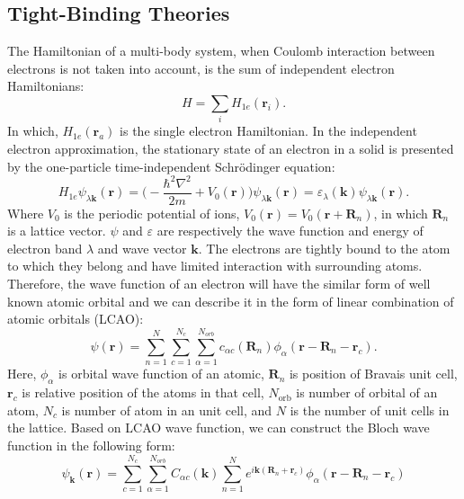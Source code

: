 \documentclass[12pt,english,a4paper]{article}
\begin{document}
	\subsection{Tight-Binding Theories}
	\quad The Hamiltonian of a multi-body system, when Coulomb interaction between electrons is not taken into account, is the sum of independent electron Hamiltonians:
	\begin{equation}
		H =\sum_{i} H_{1e} (\textbf{r}_i).
	\end{equation}
	In which, $H_{1e} (\textbf{r}_a)$ is the single electron Hamiltonian. In the independent electron approximation, the stationary state of an electron in a solid is presented by the one-particle time-independent Schrödinger equation:
	\begin{equation}
		\label{one-particle time-independent Schrödinger equation}
		H_{1e} \psi_{\lambda\textbf{k}}( \textbf{r}) = \bigg(-\frac{\hbar^2 \nabla^2}{2m} + V_0 (\textbf{r})\bigg) \psi_{\lambda \textbf{k}}(\textbf{r}) = \varepsilon_{\lambda}(\textbf{k})\psi_{\lambda \textbf{k}}(\textbf{r}).
	\end{equation}
	\quad Where $V_0$ is the periodic potential of ions, $
		V_0(\textbf{r}) = V_0 (\textbf{r}+\textbf{R}_n)$, in which $\textbf{R}_n$ is a lattice vector. $\psi$ and $\varepsilon$ are respectively the wave function and energy of electron band $\lambda$ and wave vector $\textbf{k}$. The electrons are tightly bound to the atom to which they belong and have limited interaction with surrounding atoms. Therefore, the wave function of an electron will have the similar form of well known atomic orbital and we can describe it in the form of linear combination of atomic orbitals (LCAO):
	\begin{equation}
		\psi(\textbf{r}) = \sum_{n=1}^N \sum_{c=1}^{N_c}\sum_{\alpha = 1}^{N_{orb}}c_{\alpha c}(\textbf{R}_n) \phi_\alpha(\textbf{r} -\textbf{R}_n- \textbf{r}_c).
	\end{equation}
	Here, $\phi_\alpha$ is orbital wave function of an atomic, $\textbf{R}_n$ is position of Bravais unit cell, $\textbf{r}_c$ is relative position of the atoms in that cell, $N_{\mathrm{orb}}$ is number of orbital of an atom, $N_c$ is number of atom in an unit cell, and $N$ is the number of unit cells in the lattice. Based on LCAO wave function, we can construct the Bloch wave function in the following form:
	\begin{equation}
		\label{Bloch TB}
		\psi_{\textbf{k}} (\textbf{r}) = \sum_{c=1}^{N_c} \sum_{\alpha = 1}^{N_{orb}} C_{\alpha c} (\textbf{k}) \sum_{n=1}^N e^{i\textbf{k}(\textbf{R}_n +\textbf{r}_c)} \phi_{\alpha}(\textbf{r} -\textbf{R}_n -\textbf{r}_c)
	\end{equation}
\end{document}
